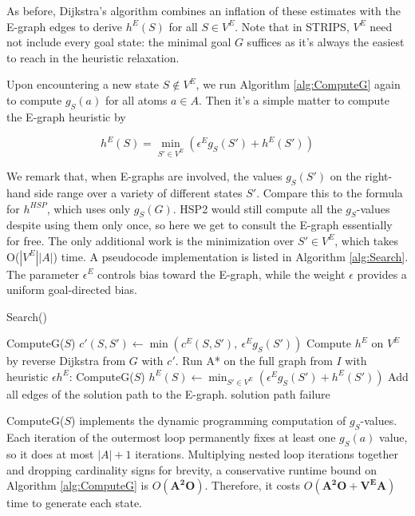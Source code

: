 \documentclass[letterpaper]{article}
\begin{document}
As before, Dijkstra's algorithm combines an inflation of these estimates with the E-graph edges to derive $h^E(S)$ for all $S\in V^E$. Note that in STRIPS, $V^E$ need not include every goal state: the minimal goal $G$ suffices as it's always the easiest to reach in the heuristic relaxation.

Upon encountering a new state $S\notin V^E$, we run Algorithm \ref{alg:ComputeG} again to compute $g_S(a)$ for all atoms $a\in A$. Then it's a simple matter to compute the E-graph heuristic by

\[h^E(S) = \min_{S'\in V^E} \left( \epsilon^E g_S(S') + h^E(S') \right)\]

We remark that, when E-graphs are involved, the values $g_S(S')$ on the right-hand side range over a variety of different states $S'$. Compare this to the formula for $h^{HSP}$, which uses only $g_S(G)$. HSP2 would still compute all the $g_S$-values despite using them only once, so here we get to consult the E-graph essentially for free. The only additional work is the minimization over $S'\in V^E$, which takes O($|V^E||A|$) time. A pseudocode implementation is listed in Algorithm \ref{alg:Search}. The parameter $\epsilon^E$ controls bias toward the E-graph, while the weight $\epsilon$ provides a uniform goal-directed bias.

\begin{algorithm}
\caption{Search()}
\label{alg:Search}
\begin{algorithmic}
\STATE ComputeG($S$)
\STATE $c'(S,S') \leftarrow \min\left(c^E(S,S'),~\epsilon^E g_S(S')\right)$
\ENDFOR
\ENDFOR
\STATE Compute $h^E$ on $V^E$ by reverse Dijkstra from $G$ with $c'$.
\STATE Run A* on the full graph from $I$ with heuristic $\epsilon h^E$:
\STATE ComputeG($S$)
\STATE $h^E(S) \leftarrow \min_{S'\in V^E} \left( \epsilon^E g_S(S') + h^E(S') \right)$
\ENDFOR
{}
\STATE Add all edges of the solution path to the E-graph.
\RETURN solution path
\ELSE
\RETURN failure
\ENDIF
\end{algorithmic}
\end{algorithm}

ComputeG($S$) implements the dynamic programming computation of $g_S$-values.
Each iteration of the outermost loop permanently fixes at least one $g_S(a)$ value, so it does at most $|A|+1$ iterations.
Multiplying nested loop iterations together and dropping cardinality signs for brevity, a conservative runtime bound on Algorithm \ref{alg:ComputeG} is $O(\mathbf{A^2O})$.
Therefore, it costs $O(\mathbf{A^2O + V^EA})$ time to generate each state.
\end{document}
